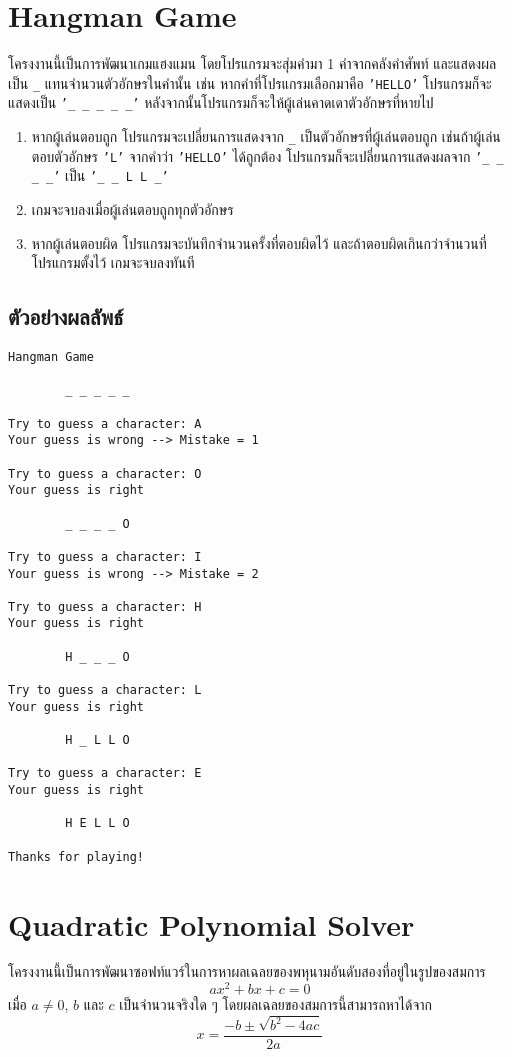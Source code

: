 \documentclass[a4paper]{article}
\begin{document}
\cleardoublepage
\section{Hangman Game}
โครงงานนี้เป็นการพัฒนาเกมแฮงแมน โดยโปรแกรมจะสุ่มคำมา 1 คำจากคลังคำศัพท์ และแสดงผลเป็น \texttt{_} แทนจำนวนตัวอักษรในคำนั้น เช่น หากคำที่โปรแกรมเลือกมาคือ \texttt{'HELLO'} โปรแกรมก็จะแสดงเป็น \texttt{'_ _ _ _ _'} หลังจากนั้นโปรแกรมก็จะให้ผู้เล่นคาดเดาตัวอักษรที่หายไป
\begin{enumerate}
    \item หากผู้เล่นตอบถูก โปรแกรมจะเปลี่ยนการแสดงจาก \texttt{_} เป็นตัวอักษรที่ผู้เล่นตอบถูก เช่นถ้าผู้เล่นตอบตัวอักษร \texttt{'L'} จากคำว่า \texttt{'HELLO'}  ได้ถูกต้อง โปรแกรมก็จะเปลี่ยนการแสดงผลจาก  \texttt{'_ _ _ _'} เป็น \texttt{'_ _ L L _'}
    \item เกมจะจบลงเมื่อผู้เล่นตอบถูกทุกตัวอักษร
    \item หากผู้เล่นตอบผิด โปรแกรมจะบันทึกจำนวนครั้งที่ตอบผิดไว้ และถ้าตอบผิดเกินกว่าจำนวนที่โปรแกรมตั้งไว้ เกมจะจบลงทันที
\end{enumerate}

\subsection*{ตัวอย่างผลลัพธ์}
\begin{verbatim}
Hangman Game

        _ _ _ _ _
        
Try to guess a character: A
Your guess is wrong --> Mistake = 1

Try to guess a character: O
Your guess is right 

        _ _ _ _ O
        
Try to guess a character: I
Your guess is wrong --> Mistake = 2

Try to guess a character: H
Your guess is right 

        H _ _ _ O

Try to guess a character: L
Your guess is right 

        H _ L L O
        
Try to guess a character: E
Your guess is right 

        H E L L O
        
Thanks for playing!
\end{verbatim}


\cleardoublepage
\section{Quadratic Polynomial Solver}
โครงงานนี้เป็นการพัฒนาซอฟท์แวร์ในการหาผลเฉลยของพหุนามอันดับสองที่อยู่ในรูปของสมการ
\[ ax^2 + bx + c = 0 \]
เมื่อ $a \neq 0$, $b$ และ $c$ เป็นจำนวนจริงใด ๆ
โดยผลเฉลยของสมการนี้สามารถหาได้จาก
\[ x = \frac{-b \pm \sqrt{b^2-4ac}}{2a} \]
\end{document}
